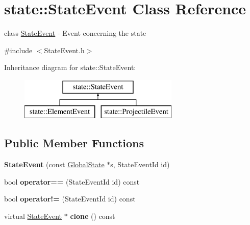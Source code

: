 \hypertarget{classstate_1_1_state_event}{}\section{state\+:\+:State\+Event Class Reference}
\label{classstate_1_1_state_event}


class \hyperlink{classstate_1_1_state_event}{State\+Event} -\/ Event concerning the state  




{\ttfamily \#include $<$State\+Event.\+h$>$}

Inheritance diagram for state\+:\+:State\+Event\+:\begin{figure}[H]
\begin{center}
\leavevmode
\includegraphics[height=2.000000cm]{classstate_1_1_state_event}
\end{center}
\end{figure}
\subsection*{Public Member Functions}
\begin{DoxyCompactItemize}
\item 
\mbox{\label{classstate_1_1_state_event_aba4c5ef79ab8d4f7d4e3981221832d41}} 
{\bfseries State\+Event} (const \hyperlink{classstate_1_1_global_state}{Global\+State} $\ast$s, State\+Event\+Id id)
\item 
\mbox{\label{classstate_1_1_state_event_a8c090eaaf0faf9bea8a38c257a813a39}} 
bool {\bfseries operator==} (State\+Event\+Id id) const
\item 
\mbox{\label{classstate_1_1_state_event_a89cb7184a64287e838e49c41b0b48bd5}} 
bool {\bfseries operator!=} (State\+Event\+Id id) const
\item 
\mbox{\label{classstate_1_1_state_event_ae4bc562dbc81c2880ed3dd0f5dc83638}} 
virtual \hyperlink{classstate_1_1_state_event}{State\+Event} $\ast$ {\bfseries clone} () const
\end{DoxyCompactItemize}
